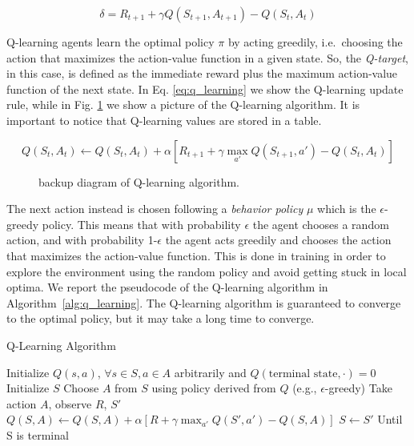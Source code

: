 \begin{equation} \label{eq:td_error}
    \delta = R_{t+1} + \gamma Q(S_{t+1}, A_{t+1}) - Q(S_t, A_t)
\end{equation}



Q-learning agents learn the optimal policy $\pi$ by acting greedily, i.e.\ choosing the action that maximizes the action-value function in a given state.
So, the \textit{Q-target}, in this case, is defined as the immediate reward plus the maximum action-value function of the next state.
In Eq. \ref{eq:q_learning} we show the Q-learning update rule, while in Fig. \ref{fig:q_learning} we show a picture of the Q-learning algorithm.
It is important to notice that Q-learning values are stored in a table.

\begin{equation} \label{eq:q_learning}
    Q(S_t, A_t) \leftarrow Q(S_t, A_t) + \alpha [R_{t+1} + \gamma \max_{a'} Q(S_{t+1}, a') - Q(S_t, A_t)]
\end{equation}

\begin{figure}[ht]
    \begin{center}
        \fbox{\rule[-.5cm]{0cm}{4cm} \rule[-.5cm]{4cm}{0cm}}
    \end{center}
    \caption{ backup diagram of Q-learning algorithm.}
    \label{fig:q_learning}
\end{figure}


The next action instead is chosen following a \textit{behavior policy} $\mu$ which is the $\epsilon$-greedy policy.
This means that with probability $\epsilon$ the agent chooses a random action, and with probability 1-$\epsilon$ the agent acts greedily and chooses the action that maximizes the action-value function.
This is done in training in order to explore the environment using the random policy and avoid getting stuck in local optima.
We report the pseudocode of the Q-learning algorithm in Algorithm~\ref{alg:q_learning}.
The Q-learning algorithm is guaranteed to converge to the optimal policy, but it may take a long time to converge.



\begin{algorithm}
\caption{Q-Learning Algorithm}\label{alg:q_learning}
\begin{algorithmic}
\State Initialize $Q(s, a)$,  $\forall s \in S, a \in A$ arbitrarily and $Q(\text{terminal state}, \cdot) = 0$
    \State Initialize $S$
        \State Choose $A$ from $S$ using policy derived from $Q$ (e.g., $\epsilon$-greedy)
        \State Take action $A$, observe $R$, $S'$
        \State $Q(S, A) \leftarrow Q(S, A) + \alpha [R + \gamma \max_{a'} Q(S', a') - Q(S, A)]$
        \State $S \leftarrow S'$
    \EndFor
\State Until S is terminal
\EndFor




\end{algorithmic}
\end{algorithm}






